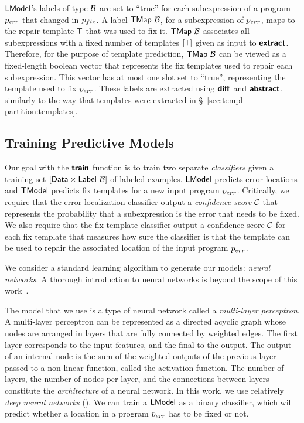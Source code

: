 $\mathsf{LModel}$'s labels of type $\mathcal{B}$ are set to ``true'' for each subexpression
of a program $p_{err}$ that changed in $p_{fix}$. A label $\mathsf{TMap}\ \mathcal{B}$, for a
subexpression of $p_{err}$, maps to the repair template $\mathsf{T}$ that was used to fix
it. $\mathsf{TMap}\ \mathcal{B}$ associates all subexpressions with a fixed number of
templates $[\mathsf{T}]$ given as input to $\bm{\mathsf{extract}}$. Therefore, for the
purpose of template prediction, $\mathsf{TMap}\ \mathcal{B}$ can be viewed as a
fixed-length boolean vector that represents the fix templates used to repair
each subexpression. This vector has at most one slot set to ``true'',
representing the template used to fix $p_{err}$. These labels are extracted using
$\bm{\mathsf{diff}}$ and $\bm{\mathsf{abstract}}$, similarly to the way that templates were extracted
in \S~\ref{sec:templ-partition:templates}.


\subsection{Training Predictive Models}
\label{sec:templ-pred:train}
\lstDeleteShortInline{|} %

Our goal with the $\bm{\mathsf{train}}$ function is to train two separate
\emph{classifiers} given a training set $[\mathsf{Data} \times
\mathsf{Label}\ \mathcal{B}]$ of labeled examples. $\mathsf{LModel}$ predicts error locations and
$\mathsf{TModel}$ predicts fix templates for a new input program $p_{err}$. Critically, we
require that the error localization classifier output a \emph{confidence score}
$\mathcal{C}$ that represents the probability that a subexpression is the error that
needs to be fixed. We also require that the fix template classifier output a
confidence score $\mathcal{C}$ for each fix template that measures
how sure the classifier is that the template can be used to repair the
associated location of the input program $p_{err}$.

We consider a standard learning algorithm to generate our models: \emph{neural
networks}. A thorough introduction to neural networks is
beyond the scope of this work~\citep{Hastie2009-bn,Nielsen2015-pu}.

The model that we use is a type of neural network called a \emph{multi-layer
perceptron}. A multi-layer perceptron can be represented as a directed acyclic
graph whose nodes are arranged in layers that are fully connected by weighted
edges. The first layer corresponds to the input features, and the final to the
output. The output of an internal node is the sum of the weighted
outputs of the previous layer passed to a non-linear function, called the
activation function. The number of layers,
the number of nodes per layer, and the connections between layers constitute the
\emph{architecture} of a neural network. In this work, we use relatively
\emph{deep neural networks} (\dnn). We can train a \dnn $\mathsf{LModel}$ as a
binary classifier, which will predict whether a location in a program $p_{err}$
has to be fixed or not.

